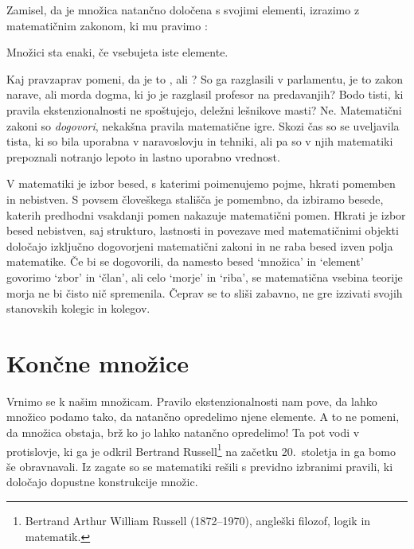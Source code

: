 Zamisel, da je množica natančno določena s svojimi elementi, izrazimo z matematičnim
zakonom, ki mu pravimo :

\begin{pravilo}
  Množici sta enaki, če vsebujeta iste elemente.
\end{pravilo}

Kaj pravzaprav pomeni, da je to ,  ali ? So ga
razglasili v parlamentu, je to zakon narave, ali morda dogma, ki jo je razglasil profesor
na predavanjih? Bodo tisti, ki pravila ekstenzionalnosti ne spoštujejo, deležni lešnikove
masti? Ne. Matematični zakoni so \emph{dogovori}, nekakšna pravila matematične igre. Skozi
čas so se uveljavila tista, ki so bila uporabna v naravoslovju in tehniki, ali pa so v njih
matematiki prepoznali notranjo lepoto in lastno uporabno vrednost.

V matematiki je izbor besed, s katerimi poimenujemo pojme, hkrati pomemben in nebistven.
%
S povsem človeškega stališča je pomembno, da izbiramo besede, katerih predhodni vsakdanji pomen nakazuje matematični pomen.
%
Hkrati je izbor besed nebistven, saj strukturo, lastnosti in povezave med
matematičnimi objekti določajo izključno dogovorjeni matematični zakoni in ne raba besed izven polja matematike.
%
Če bi se dogovorili, da namesto besed  `množica' in `element' govorimo `zbor' in `član', ali celo `morje' in `riba', se matematična vsebina teorije morja ne bi čisto nič spremenila.
%
Čeprav se to sliši zabavno, ne gre izzivati svojih stanovskih kolegic in kolegov.

\section{Končne množice}
\label{sec:koncne-mnozice}

Vrnimo se k našim množicam. Pravilo ekstenzionalnosti nam pove, da lahko množico podamo
tako, da natančno opredelimo njene elemente. A to ne pomeni, da množica obstaja, brž ko jo
lahko natančno opredelimo! Ta  pot vodi v protislovje, ki ga je odkril Bertrand Russell\footnote{Bertrand Arthur William Russell (1872--1970), angleški filozof, logik in matematik.} na začetku 20.~stoletja in ga bomo še obravnavali.
Iz zagate so se matematiki rešili s previdno izbranimi pravili, ki določajo dopustne konstrukcije množic.

